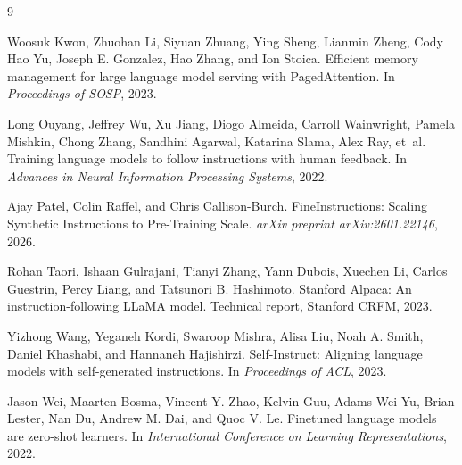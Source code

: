 \documentclass{article}
\begin{document}

\begin{thebibliography}{9}

Woosuk Kwon, Zhuohan Li, Siyuan Zhuang, Ying Sheng, Lianmin Zheng, Cody Hao Yu,
Joseph E. Gonzalez, Hao Zhang, and Ion Stoica.
\newblock Efficient memory management for large language model serving with
PagedAttention.
\newblock In \emph{Proceedings of SOSP}, 2023.

Long Ouyang, Jeffrey Wu, Xu Jiang, Diogo Almeida, Carroll Wainwright, Pamela
Mishkin, Chong Zhang, Sandhini Agarwal, Katarina Slama, Alex Ray, et~al.
\newblock Training language models to follow instructions with human feedback.
\newblock In \emph{Advances in Neural Information Processing Systems}, 2022.

Ajay Patel, Colin Raffel, and Chris Callison-Burch.
\newblock FineInstructions: Scaling Synthetic Instructions to Pre-Training
Scale.
\newblock \emph{arXiv preprint arXiv:2601.22146}, 2026.

Rohan Taori, Ishaan Gulrajani, Tianyi Zhang, Yann Dubois, Xuechen Li, Carlos
Guestrin, Percy Liang, and Tatsunori B. Hashimoto.
\newblock Stanford Alpaca: An instruction-following LLaMA model.
\newblock Technical report, Stanford CRFM, 2023.

Yizhong Wang, Yeganeh Kordi, Swaroop Mishra, Alisa Liu, Noah A. Smith, Daniel
Khashabi, and Hannaneh Hajishirzi.
\newblock Self-Instruct: Aligning language models with self-generated
instructions.
\newblock In \emph{Proceedings of ACL}, 2023.

Jason Wei, Maarten Bosma, Vincent Y. Zhao, Kelvin Guu, Adams Wei Yu, Brian
Lester, Nan Du, Andrew M. Dai, and Quoc V. Le.
\newblock Finetuned language models are zero-shot learners.
\newblock In \emph{International Conference on Learning Representations}, 2022.

\end{thebibliography}
\end{document}
